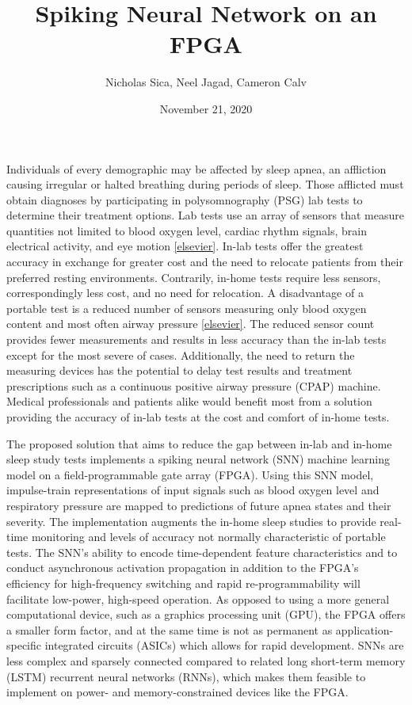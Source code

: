\documentclass[12pt,titlepage]{article}
\title{Spiking Neural Network on an FPGA}
\author{Nicholas Sica, Neel Jagad, Cameron Calv}
\date{November 21, 2020}
\begin{document}
\maketitle
\newpage
\clearpage
{}

Individuals of every demographic may be affected by sleep apnea, an affliction causing irregular or halted breathing during periods of sleep. 
Those afflicted must obtain diagnoses by participating in polysomnography (PSG) lab tests to determine their treatment options. 
Lab tests use an array of sensors that measure quantities not limited to blood oxygen level, cardiac rhythm signals, brain electrical activity,
and eye motion \ref{elsevier}. In-lab tests offer the greatest accuracy in exchange for greater cost and the need to relocate patients from
their preferred resting environments.
Contrarily, in-home tests require less sensors, correspondingly less cost, and no need for relocation.
A disadvantage of a portable test is a reduced number of sensors measuring only blood oxygen content and most often airway pressure \ref{elsevier}.
The reduced sensor count provides fewer measurements and results in less accuracy than the in-lab tests except for the most severe of cases.
Additionally, the need to return the measuring devices has the potential to delay test results and treatment prescriptions such as a continuous
positive airway pressure (CPAP) machine.
Medical professionals and patients alike would benefit most from a solution providing the accuracy of in-lab tests at the cost and comfort of
in-home tests. 

The proposed solution that aims to reduce the gap between in-lab and in-home sleep study tests implements a spiking neural network (SNN)
machine learning model on a field-programmable gate array (FPGA). Using this SNN model, impulse-train representations of input signals
such as blood oxygen level and respiratory pressure are mapped to predictions of future apnea states and their severity.
The implementation augments the in-home sleep studies to provide real-time monitoring and levels of accuracy not normally characteristic of
portable tests. The SNN’s ability to encode time-dependent feature characteristics and to conduct asynchronous activation propagation
in addition to the FPGA’s efficiency for high-frequency switching and rapid re-programmability will facilitate low-power, high-speed operation.
As opposed to using a more general computational device, such as a graphics processing unit (GPU), the FPGA offers a smaller form factor, and
at the same time is not as permanent as application-specific integrated circuits (ASICs) which allows for rapid development. SNNs are less complex
and sparsely connected compared to related long short-term memory (LSTM) recurrent neural networks (RNNs), which makes them feasible to implement
on power- and memory-constrained devices like the FPGA. 
\end{document}
